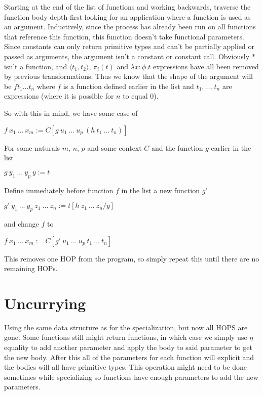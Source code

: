 \documentclass[12pt,a4paper,titlepage]{article}
\begin{document}
    Starting at the end of the list of functions and working backwards, traverse the function body depth first
    looking for an application where a function is used as an argument.
    Inductively, since the process has already been run on all functions that reference this function, this
    function doesn't take functional parameters.
    Since constants can only return primitive types and can't be partially applied or passed as arguments,
    the argument isn't a constant or constant call. Obviously $\ast$ isn't a function, and $\langle t_1, t_2 \rangle$,
    $\pi_i (t)$ and $\lambda x: \phi . t$ expressions have all been removed by previous transformations.
    Thus we know that the shape of the argument will be $f t_1 ... t_n$ where $f$ is a function defined earlier
    in the list and $t_1, ..., t_n$ are expressions (where it is possible for $n$ to equal 0).

    So with this in mind, we have some case of

    $f\ x_1\ ...\ x_m := C[g\ u_1\ ...\ u_p\ (h\ t_1\ ...\ t_n)]$

    For some naturals $m$, $n$, $p$ and some context $C$ and the function $g$ earlier in the list

    $g\ y_1\ ...\ y_p\ y := t$

    Define immediately before function $f$ in the list a new function $g'$

    $g'\ y_1\ ...\ y_p\ z_1\ ...\ z_n := t[h\ z_1\ ...\ z_n / y]$

    and change $f$ to

    $f\ x_1\ ...\ x_m := C[g'\ u_1\ ...\ u_p\ t_1\ ...\ t_n]$

    This removes one HOP from the program, so simply repeat this until there are no remaining HOPs.

    \section{Uncurrying}

    Using the same data structure as for the specialization, but now all HOPS are gone.
    Some functions still might return functions, in which case we simply use $\eta$ equality to add
    another parameter and apply the body to said parameter to get the new body.
    After this all of the parameters for each function will explicit and the bodies will all have
    primitive types. This operation might need to be done sometimes while specializing so functions have enough
    parameters to add the new parameters.
\end{document}

